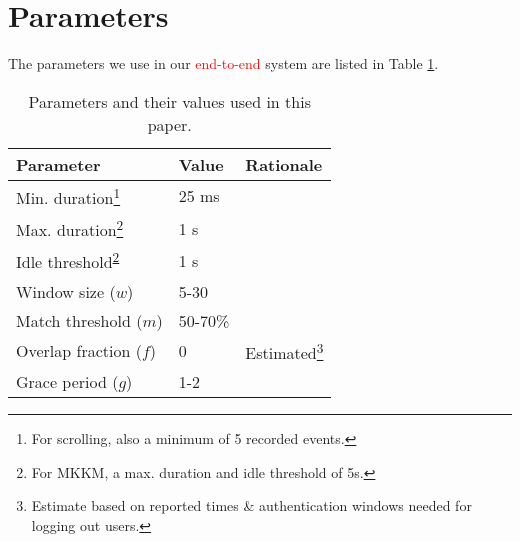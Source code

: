 \documentclass[conference]{IEEEtran}
\newcommand\changeMika[1]{\textcolor{red}{#1}}
\newcommand\changeMika[1]{{#1}}
\begin{document}
\section{Parameters}
\label{app:parameteres}

The parameters we use in our \changeMika{end-to-end} system are listed in Table \ref{tab:parameters}.
\begin{table}[!h]
\centering
	\caption{Parameters and their values used in this paper.}
\begin{minipage}{\columnwidth}
	\begin{tabularx}{\textwidth}{|X|X|X|}
	\hline
	\textbf{Parameter} & \textbf{Value} & \textbf{Rationale}\\[6pt]
	\hline
	Min. duration\footnote{For scrolling, also a minimum of 5 recorded events.} & 25 ms & \cite{mare}\\
	\hline
	Max. duration\footnote{\label{fn:two}For MKKM, a max. duration and idle threshold of 5s.\cite{mare} } & 1 s & \cite{mare2014zebra}\\
	\hline
	Idle threshold\textsuperscript{\ref{fn:two}} & 1 s & \cite{mare}\\	
	\hline
	Window size ($w$) & 5-30 & \cite{mare2014zebra}\\
	\hline
	Match threshold ($m$) & 50-70\% & \cite{mare2014zebra}\\
	\hline
	Overlap fraction ($f$) & 0 & Estimated\footnote{Estimate based on reported \cite{mare2014zebra} times \& authentication windows needed for logging out users.}\\
	\hline
	Grace period ($g$) & 1-2 & \cite{mare2014zebra}\\
	\hline
	\end{tabularx}
\end{minipage}
	\label{tab:parameters}
\end{table}
\end{document}
